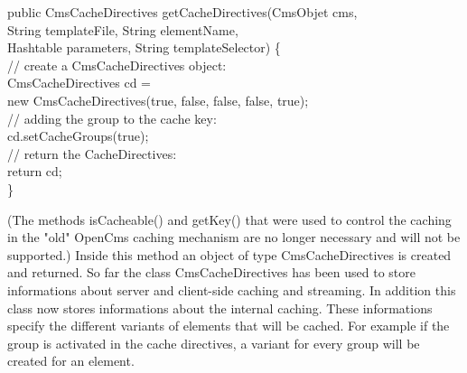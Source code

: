 \begin{java}
public  CmsCacheDirectives getCacheDirectives(CmsObjet cms,\\
\jtabb      String templateFile, String elementName,\\
\jtabb      Hashtable parameters, String templateSelector) \{\\
\jtaba      // create a CmsCacheDirectives object:\\
\jtaba      CmsCacheDirectives cd = \\
\jtabb          new CmsCacheDirectives(true, false, false, false, true);\\
\jtaba      // adding the group to the cache key:\\
\jtaba      cd.setCacheGroups(true);\\
\jtaba      // return the CacheDirectives:\\
\jtaba      return cd;\\
\}\\
\end{java}


(The methods {\meth isCacheable()}  
and {\meth getKey()} that were used to control the caching in 
the "old" OpenCms caching mechanism are no longer necessary and will not be supported.) 
Inside this method an object of type {\class CmsCacheDirectives} is created and returned. 
So far the class {\class CmsCacheDirectives} has been used to store informations about server 
and client-side caching and streaming. In addition this class now stores informations 
about the internal caching. These informations specify the different variants of elements 
that will be cached. For example if the group is activated in the cache directives, 
a variant for every group will be created for an element.

